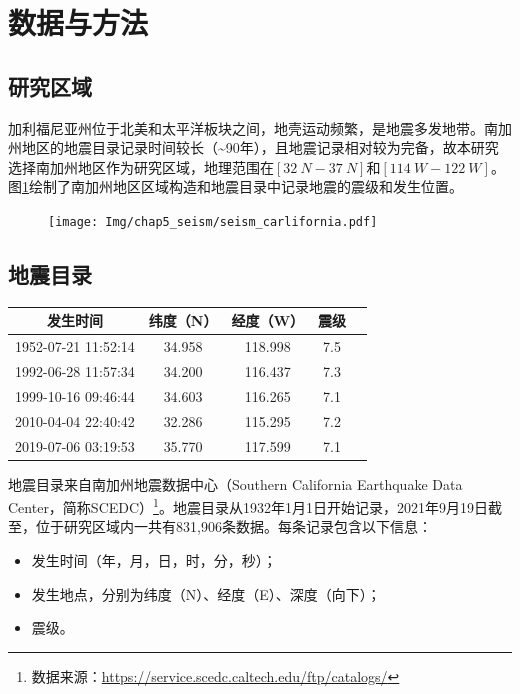 \section{数据与方法}\label{sec:seism_data_method}

\subsection{研究区域}\label{sec:seism_area}

加利福尼亚州位于北美和太平洋板块之间，地壳运动频繁，是地震多发地带。南加州地区的地震目录记录时间较长（\sim 90年），且地震记录相对较为完备，故本研究选择南加州地区作为研究区域，地理范围在$[\SI{32}{N}-\SI{37}{N}]$和$[\SI{114}{W}-\SI{122}{W}]$。图\ref{fig:seism_california}绘制了南加州地区区域构造和地震目录中记录地震的震级和发生位置。

\begin{figure}[!htbp]
  \centering
  \texttt{[image: Img/chap5\_seism/seism\_carlifornia.pdf]}
  \label{fig:seism_california}
\end{figure}

\subsection{地震目录}\label{sec:seism_catolog}

\begin{table}[!htbp]
  \label{tab:seism_magnitude_7}
  \centering
  \footnotesize
  \begin{tabular}{ccccc} 
    \toprule
    发生时间 & 纬度（N） & 经度（W） & 震级 \\
    \midrule
    1952-07-21 11:52:14 & 34.958 & 118.998 & 7.5 \\
    1992-06-28 11:57:34 & 34.200 & 116.437 & 7.3 \\
    1999-10-16 09:46:44 & 34.603 & 116.265 & 7.1 \\
    2010-04-04 22:40:42 & 32.286 & 115.295 & 7.2 \\
    2019-07-06 03:19:53 & 35.770 & 117.599 & 7.1 \\
    \bottomrule
  \end{tabular}
\end{table}


地震目录来自南加州地震数据中心（Southern California Earthquake Data Center，简称SCEDC）\footnote{数据来源：\href{https://service.scedc.caltech.edu/ftp/catalogs/}{https://service.scedc.caltech.edu/ftp/catalogs/}}。地震目录从1932年1月1日开始记录，2021年9月19日截至，位于研究区域内一共有831,906条数据。每条记录包含以下信息：
\begin{itemize}
  \item[1] 发生时间（年，月，日，时，分，秒）；
  \item[2] 发生地点，分别为纬度（N）、经度（E）、深度（向下）；
  \item[3] 震级。
\end{itemize}

